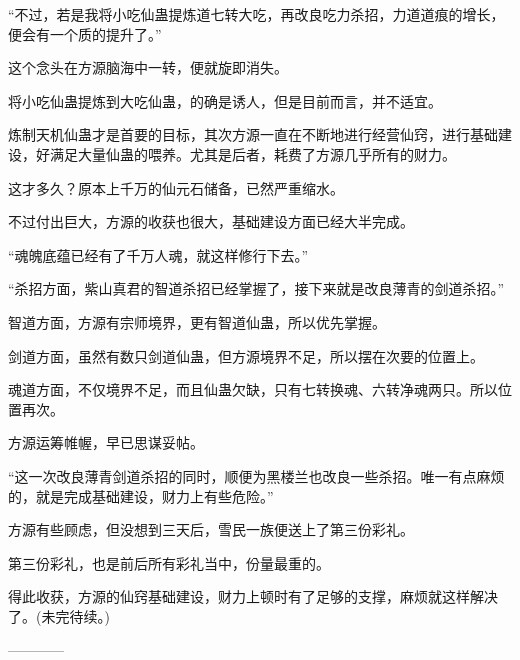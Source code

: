 \begin{this_body}
“不过，若是我将小吃仙蛊提炼道七转大吃，再改良吃力杀招，力道道痕的增长，便会有一个质的提升了。”

这个念头在方源脑海中一转，便就旋即消失。

将小吃仙蛊提炼到大吃仙蛊，的确是诱人，但是目前而言，并不适宜。

炼制天机仙蛊才是首要的目标，其次方源一直在不断地进行经营仙窍，进行基础建设，好满足大量仙蛊的喂养。尤其是后者，耗费了方源几乎所有的财力。

这才多久？原本上千万的仙元石储备，已然严重缩水。

不过付出巨大，方源的收获也很大，基础建设方面已经大半完成。

“魂魄底蕴已经有了千万人魂，就这样修行下去。”

“杀招方面，紫山真君的智道杀招已经掌握了，接下来就是改良薄青的剑道杀招。”

智道方面，方源有宗师境界，更有智道仙蛊，所以优先掌握。

剑道方面，虽然有数只剑道仙蛊，但方源境界不足，所以摆在次要的位置上。

魂道方面，不仅境界不足，而且仙蛊欠缺，只有七转换魂、六转净魂两只。所以位置再次。

方源运筹帷幄，早已思谋妥帖。

“这一次改良薄青剑道杀招的同时，顺便为黑楼兰也改良一些杀招。唯一有点麻烦的，就是完成基础建设，财力上有些危险。”

方源有些顾虑，但没想到三天后，雪民一族便送上了第三份彩礼。

第三份彩礼，也是前后所有彩礼当中，份量最重的。

得此收获，方源的仙窍基础建设，财力上顿时有了足够的支撑，麻烦就这样解决了。(未完待续。)

------------

\end{this_body}


